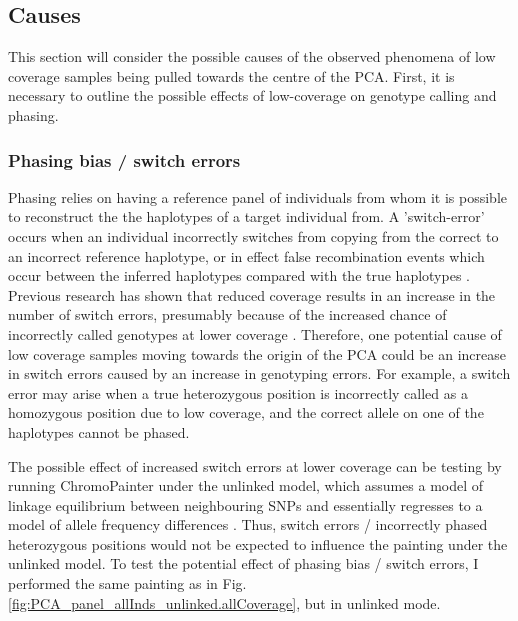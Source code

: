 \subsection{Causes}

This section will consider the possible causes of the observed phenomena of low coverage samples being pulled towards the centre of the PCA. First, it is necessary to outline the possible effects of low-coverage on genotype calling and phasing. 

\subsubsection{Phasing bias / switch errors}

Phasing relies on having a reference panel of individuals from whom it is possible to reconstruct the the haplotypes of a target individual from. A 'switch-error' occurs when an individual incorrectly switches from copying from the correct to an incorrect reference haplotype, or in effect false recombination events which occur between the inferred haplotypes compared with the true haplotypes \cite{choi2018comparison}. Previous research has shown that reduced coverage results in an increase in the number of switch errors, presumably because of the increased chance of incorrectly called genotypes at lower coverage \cite{rubinacci2021efficient}. Therefore, one potential cause of low coverage samples moving towards the origin of the PCA could be an increase in switch errors caused by an increase in genotyping errors. For example, a switch error may arise when a true heterozygous position is incorrectly called as a homozygous position due to low coverage, and the correct allele on one of the haplotypes cannot be phased. 

The possible effect of increased switch errors at lower coverage can be testing by running ChromoPainter under the unlinked model, which assumes a model of linkage equilibrium between neighbouring SNPs and essentially regresses to a model of allele frequency differences \cite{Lawson2012}. Thus, switch errors / incorrectly phased heterozygous positions would not be expected to influence the painting under the unlinked model. To test the potential effect of phasing  bias / switch errors, I performed the same painting as in Fig. \ref{fig:PCA_panel_allInds_unlinked.allCoverage}, but in unlinked mode. 

